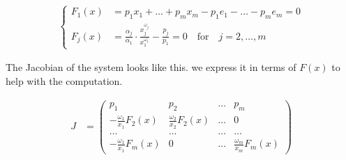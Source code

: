 \documentclass[a4paper,12pt]{article}
\begin{document}
    \begin{align}\label{systemF}
    \begin{cases}
        F_1(x) & = p_1x_1 + \dots + p_mx_m - p_1e_1 -\dots - p_me_m = 0 \\  F_j(x) & = \frac{\alpha_j}{\alpha_1} \cdot \frac{x_j^{\omega_j}}{x_1^{\omega_1}} - \frac{p_j}{p_1} = 0 \quad\text{for}\quad j = 2,\dots,m
    \end{cases}
    \end{align}
    
    The Jacobian of the system looks like this. we express it in terms of $F(x)$ to help with the computation. 
    
    \begin{align*}
        J & = \begin{pmatrix} p_1 & p_2 & \dots & p_m \\ -\frac{\omega_1}{x_1}  F_2(x) & \frac{\omega_2}{x_2} F_2(x) & \dots & 0 \\ \dots & \dots & \dots &\dots \\ -\frac{\omega_1}{x_1} F_m(x) & 0 & \dots & \frac{\omega_m}{x_m} F_m(x) \end{pmatrix}
    \end{align*}
    
    
    
  

    






    


    

    
    
 
\end{document}
